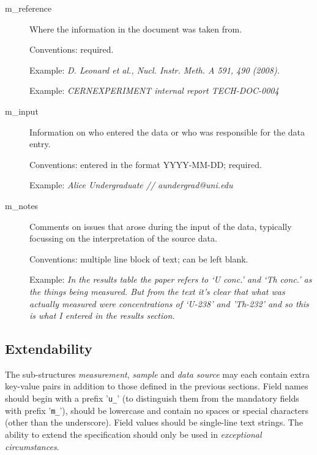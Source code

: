 \documentclass[11pt, letterpaper]{article}
\begin{document}
\begin{description}

  \item[m\_reference] Where the information in the document was taken from.

  Conventions: required.
  
  Example: \textit{D. Leonard et al., Nucl. Instr. Meth. A 591, 490 (2008).}

  Example: \textit{CERNEXPERIMENT internal report TECH-DOC-0004}

  \item[m\_input] Information on who entered the data or who was responsible for the data entry.

  Conventions: entered in the format YYYY-MM-DD; required.
  
  Example: \textit{Alice Undergraduate // aundergrad@uni.edu}     

  \item[m\_notes] Comments on issues that arose during the input of the data, typically focussing on the interpretation of the source data.
  
  Conventions: multiple line block of text; can be left blank.
  
  Example: \textit{In the results table the paper refers to `U conc.' and `Th conc.' as the things being measured. But from the text it's clear that what was actually measured were concentrations of `U-238' and 'Th-232' and so this is what I entered in the results section.}
  
\end{description}

\newpage
\subsection{Extendability} %

The sub-structures \textit{measurement}, \textit{sample} and \textit{data source} may each contain extra key-value pairs in addition to those defined in the previous sections. Field names should begin with a prefix '\texttt{u\_}' (to distinguish them from the mandatory fields with prefix '\texttt{m\_}'), should be lowercase and contain no spaces or special characters (other than the underscore). Field values should be single-line text strings. The ability to extend the specification should only be used in \textit{exceptional circumstances}.
\end{document}
